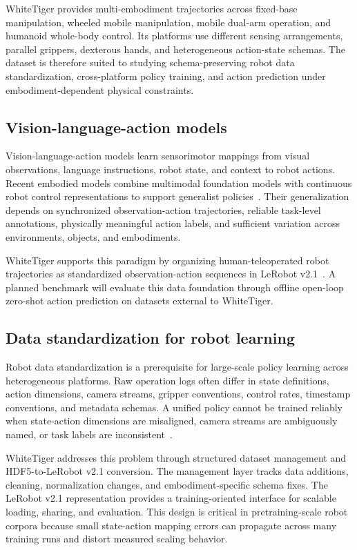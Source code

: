 WhiteTiger provides multi-embodiment trajectories across fixed-base manipulation, wheeled mobile manipulation, mobile dual-arm operation, and humanoid whole-body control. Its platforms use different sensing arrangements, parallel grippers, dexterous hands, and heterogeneous action-state schemas. The dataset is therefore suited to studying schema-preserving robot data standardization, cross-platform policy training, and action prediction under embodiment-dependent physical constraints.

\subsection{Vision-language-action models}

Vision-language-action models learn sensorimotor mappings from visual observations, language instructions, robot state, and context to robot actions. Recent embodied models combine multimodal foundation models with continuous robot control representations to support generalist policies~\cite{driess2023palme,brohan2023rt2,ghosh2024octo,kim2024openvla,black2024pi0,nvidia2025grootn1}. Their generalization depends on synchronized observation-action trajectories, reliable task-level annotations, physically meaningful action labels, and sufficient variation across environments, objects, and embodiments.

WhiteTiger supports this paradigm by organizing human-teleoperated robot trajectories as standardized observation-action sequences in LeRobot v2.1~\cite{cadene2026lerobot}. A planned benchmark will evaluate this data foundation through offline open-loop zero-shot action prediction on datasets external to WhiteTiger.

\subsection{Data standardization for robot learning}

Robot data standardization is a prerequisite for large-scale policy learning across heterogeneous platforms. Raw operation logs often differ in state definitions, action dimensions, camera streams, gripper conventions, control rates, timestamp conventions, and metadata schemas. A unified policy cannot be trained reliably when state-action dimensions are misaligned, camera streams are ambiguously named, or task labels are inconsistent~\cite{dasari2020robonet,oneill2023openx,ghosh2024octo}.

WhiteTiger addresses this problem through structured dataset management and HDF5-to-LeRobot v2.1 conversion. The management layer tracks data additions, cleaning, normalization changes, and embodiment-specific schema fixes. The LeRobot v2.1 representation provides a training-oriented interface for scalable loading, sharing, and evaluation. This design is critical in pretraining-scale robot corpora because small state-action mapping errors can propagate across many training runs and distort measured scaling behavior.

